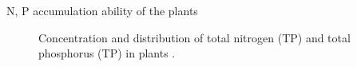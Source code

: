 \begin{frame}{N, P accumulation ability of the plants}
\begin{figure}
	\centering
	\begin{columns}[T]
\end{columns}
\caption{Concentration and distribution of total nitrogen (TP) and total phosphorus (TP) in plants \cite{yu2014biomass}.}

\end{figure}
\end{frame}

